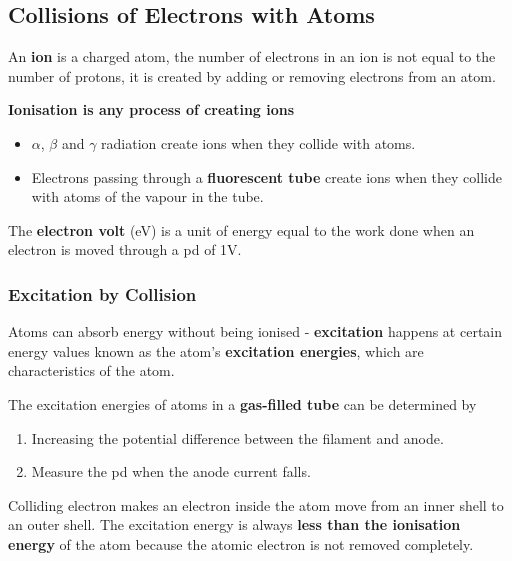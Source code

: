\subsection{Collisions of Electrons with Atoms}
An \textbf{ion} is a charged atom, the number of electrons in an ion is not equal to the number of protons, it is created by adding or removing electrons from an atom.

\textbf{Ionisation is any process of creating ions}
\begin{itemize}
    \item $\alpha$, $\beta$ and $\gamma$ radiation create ions when they collide with atoms.
    \item Electrons passing through a \textbf{fluorescent tube} create ions when they collide with atoms of the vapour in the tube.
\end{itemize}

The \textbf{electron volt} (eV) is a unit of energy equal to the work done when an electron is moved through a pd of 1V.

\subsubsection*{Excitation by Collision}

Atoms can absorb energy without being ionised - \textbf{excitation} happens at certain energy values known as the atom's \textbf{excitation energies}, which are characteristics of the atom.

The excitation energies of atoms in a \textbf{gas-filled tube} can be determined by
\begin{enumerate}
    \item Increasing the potential difference between the filament and anode.
    \item Measure the pd when the anode current falls.
\end{enumerate}

Colliding electron makes an electron inside the atom move from an inner shell to an outer shell. The excitation energy is always \textbf{less than the ionisation energy} of the atom because the atomic electron is not removed completely.
